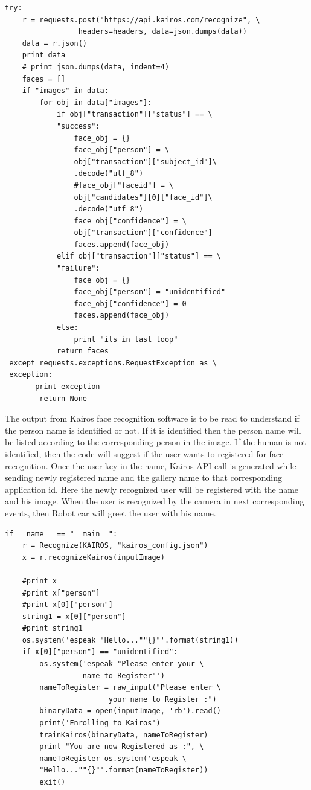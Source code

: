 \begin{verbatim}
try:
    r = requests.post("https://api.kairos.com/recognize", \ 
                 headers=headers, data=json.dumps(data))
    data = r.json()
    print data
    # print json.dumps(data, indent=4)
    faces = []
    if "images" in data:
        for obj in data["images"]:
            if obj["transaction"]["status"] == \
            "success":
                face_obj = {}
                face_obj["person"] = \
                obj["transaction"]["subject_id"]\
                .decode("utf_8")
                #face_obj["faceid"] = \
                obj["candidates"][0]["face_id"]\
                .decode("utf_8")
                face_obj["confidence"] = \
                obj["transaction"]["confidence"]
                faces.append(face_obj)
            elif obj["transaction"]["status"] == \
            "failure":
                face_obj = {}
                face_obj["person"] = "unidentified"
                face_obj["confidence"] = 0
                faces.append(face_obj)
            else:
                print "its in last loop"
            return faces
 except requests.exceptions.RequestException as \
 exception:
       print exception
        return None
\end{verbatim}    

The output from Kairos face recognition software is to be read to understand 
if the person name is identified or not. If it is identified then the person 
name will be listed according to the corresponding person in the image. If 
the human is not identified, then the code will suggest if the user wants 
to registered for face recognition. Once the user key in the name, Kairos 
API call is generated while sending newly registered name and the gallery 
name to that corresponding application id. Here the newly recognized user 
will be registered with the name and his image. When the user is recognized 
by the camera in next corresponding events, then Robot car will greet the 
user with his name.

\begin{verbatim}
if __name__ == "__main__":
    r = Recognize(KAIROS, "kairos_config.json")
    x = r.recognizeKairos(inputImage)
    
    #print x
    #print x["person"]
    #print x[0]["person"]
    string1 = x[0]["person"]
    #print string1
    os.system('espeak "Hello...""{}"'.format(string1))
    if x[0]["person"] == "unidentified":
        os.system('espeak "Please enter your \ 
                  name to Register"')
        nameToRegister = raw_input("Please enter \ 
                        your name to Register :")
        binaryData = open(inputImage, 'rb').read()
        print('Enrolling to Kairos')
        trainKairos(binaryData, nameToRegister)
        print "You are now Registered as :", \ 
        nameToRegister os.system('espeak \ 
        "Hello...""{}"'.format(nameToRegister))
        exit()
\end{verbatim}

